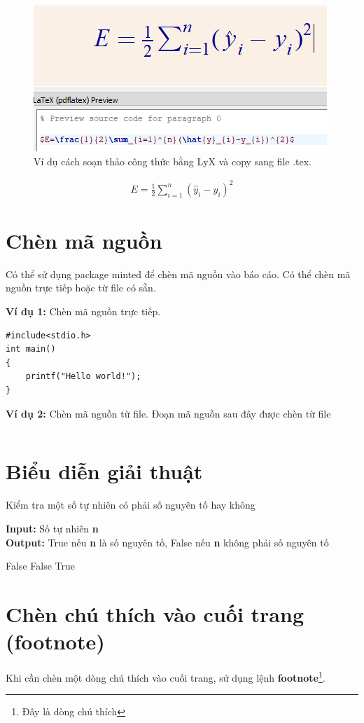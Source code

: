 \begin{center}
    \begin{figure}[h!]
    \begin{center}
     \includegraphics[scale=0.5]{figs/LyX.PNG}
    \end{center}
    \caption{Ví dụ cách soạn thảo công thức bằng LyX và copy sang file .tex.} 
    \label{lyx_example}
    \end{figure}
\end{center}

\begin{align}
E=\frac{1}{2}\sum_{i=1}^{n}(\hat{y}_{i}-y_{i})^{2}
\label{eq:ErrorFunction}
\end{align}



\section{Chèn mã nguồn}
Có thể sử dụng package minted để chèn mã nguồn vào báo cáo. Có thể chèn mã nguồn trực tiếp hoặc từ file có sẵn.

\noindent\textbf{Ví dụ 1:} Chèn mã nguồn trực tiếp.
\begin{verbatim}
#include<stdio.h>
int main()
{
	printf("Hello world!");
}
\end{verbatim}


\noindent\textbf{Ví dụ 2:} Chèn mã nguồn từ file. Đoạn mã nguồn sau đây được chèn từ file 

\inputminted{c++}{code/XulyFileText.cpp}
\section{Biểu diễn giải thuật}
    \begin{algorithm}[H]
    \caption{Kiểm tra một số tự nhiên có phải số nguyên tố hay không}\label{prime_number_check}
    \hspace*{\algorithmicindent} \textbf{Input:} 
    Số tự nhiên \textbf{n}\\
    \hspace*{\algorithmicindent} \textbf{Output:} 
    True nếu \textbf{n} là số nguyên tố,
    False nếu \textbf{n} không phải số nguyên tố
    \begin{algorithmic}[1]
     \Return False
    \EndIf
     \Return False
    \EndIf
    \EndFor
    \State \Return True
    \EndFunction
    \end{algorithmic}
    \end{algorithm}


\section{Chèn chú thích vào cuối trang (footnote)}
Khi cần chèn một dòng chú thích vào cuối trang, sử dụng lệnh \textbf{footnote}\footnote{Đây là dòng chú thích}.




